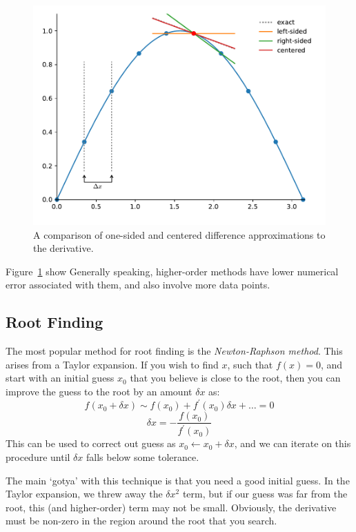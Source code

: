 \begin{figure}[t]
\centering
\includegraphics[width=0.8\linewidth]{derivs}
\caption{\label{fig:derivs} A comparison of one-sided and centered
difference approximations to the derivative.}
\end{figure}

Figure~\ref{fig:derivs} show Generally speaking, higher-order methods
have lower numerical error associated with them, and also involve more
data points.


\subsection{Root Finding}

The most popular method for root finding is the {\em Newton-Raphson method}.
This arises from a Taylor expansion.  If you wish to find $x$, such that
$f(x) = 0$, and start with an initial guess $x_0$ that you believe is
close to the root, then you can improve the guess to the root by an amount
$\delta x$ as:
\begin{equation}
f(x_0 + \delta x) \sim f(x_0) + f^\prime(x_0) \delta x + \ldots = 0
\end{equation}
\begin{equation}
\delta x = -\frac{f(x_0)}{f^\prime(x_0)}
\end{equation}
This can be used to correct out guess as $x_0 \leftarrow x_0 + \delta
x$, and we can iterate on this procedure until $\delta x$ falls below
some tolerance.

The main `gotya' with this technique is that you need a good initial guess.
In the Taylor expansion, we threw away the $\delta x^2$ term, but if our
guess was far from the root, this (and higher-order) term may not be small.
Obviously, the derivative must be non-zero in the region around the 
root that you search.

